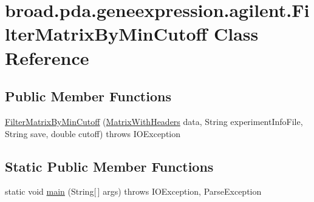 \hypertarget{classbroad_1_1pda_1_1geneexpression_1_1agilent_1_1_filter_matrix_by_min_cutoff}{\section{broad.\+pda.\+geneexpression.\+agilent.\+Filter\+Matrix\+By\+Min\+Cutoff Class Reference}
\label{classbroad_1_1pda_1_1geneexpression_1_1agilent_1_1_filter_matrix_by_min_cutoff}
}
\subsection*{Public Member Functions}
\begin{DoxyCompactItemize}
\item 
\hyperlink{classbroad_1_1pda_1_1geneexpression_1_1agilent_1_1_filter_matrix_by_min_cutoff_aee558172f3dd2ad90ba29ebe0d95e99e}{Filter\+Matrix\+By\+Min\+Cutoff} (\hyperlink{classbroad_1_1core_1_1datastructures_1_1_matrix_with_headers}{Matrix\+With\+Headers} data, String experiment\+Info\+File, String save, double cutoff)  throws I\+O\+Exception
\end{DoxyCompactItemize}
\subsection*{Static Public Member Functions}
\begin{DoxyCompactItemize}
\item 
static void \hyperlink{classbroad_1_1pda_1_1geneexpression_1_1agilent_1_1_filter_matrix_by_min_cutoff_af2016ce5ca94836a608a7af64ab65fe8}{main} (String\mbox{[}$\,$\mbox{]} args)  throws I\+O\+Exception, Parse\+Exception
\end{DoxyCompactItemize}


